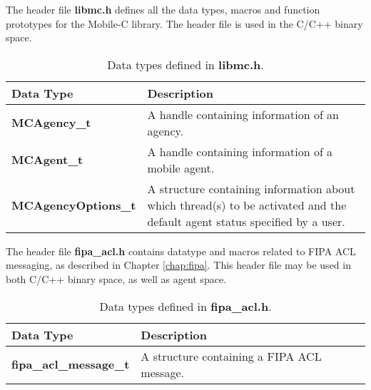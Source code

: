 \noindent
The header file {\bf libmc.h} defines all the data types, macros 
and function prototypes for the Mobile-C library.
The header file is used in the C/C++ binary space.

\begin{table}[!h]
\capstart
\begin{center}
\caption{Data types defined in {\bf libmc.h}.}
\begin{tabular}{p{50 mm}p{110 mm}}
\hline
Data Type & Description \\
\hline
{\bf MCAgency\_t} & A handle containing information of an agency. \\
{\bf MCAgent\_t} & A handle containing information of a mobile agent. \\
{\bf MCAgencyOptions\_t} & A structure containing information about which thread(s) to be activated and the default agent status specified by a user. \\
\hline
\end{tabular}
\end{center}
\label{mobilec_datatype}
\end{table}

The header file {\bf fipa\_acl.h} contains datatype and macros related to 
FIPA ACL messaging, as described in Chapter \ref{chap:fipa}. This header
file may be used in both C/C++ binary space, as well as agent space.

\begin{table}[!h]
\capstart
\begin{center}
\caption{Data types defined in {\bf fipa\_acl.h}.}
\begin{tabular}{p{50 mm}p{110 mm}}
\hline
Data Type & Description \\
\hline
{\bf fipa\_acl\_message\_t} & A structure containing a FIPA ACL message. \\
\hline
\end{tabular}
\end{center}
\label{fipa_datatype}
\end{table}

\pagebreak

